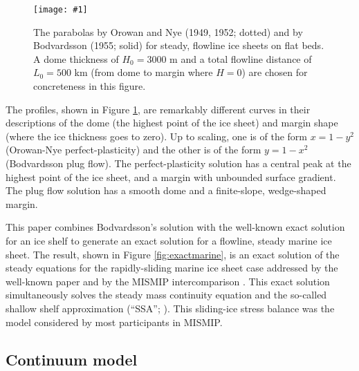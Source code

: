 \documentclass[twocolumn,letterpaper]{igs}
\newcommand{\onecol}[1]{\texttt{[image: \#1]}}
\begin{document}
\begin{figure}[ht]
\onecol{twoparabolas}
\caption{The parabolas by Orowan and Nye (1949, 1952; dotted) and by Bodvardsson (1955; solid) for steady, flowline ice sheets on flat beds.  A dome thickness of $H_0=3000$ m and a total flowline distance of $L_0=500$ km (from dome to margin where $H=0$) are chosen for concreteness in this figure.} \label{fig:twoparabolas}
\end{figure}

The profiles, shown in Figure \ref{fig:twoparabolas}, are remarkably different curves in their descriptions of the dome (the highest point of the ice sheet) and margin shape (where the ice thickness goes to zero).   Up to scaling, one is of the form $x=1-y^2$ (Orowan-Nye perfect-plasticity)\nocite{Nye52plastic,Orowan} and the other is of the form $y=1-x^2$ (Bodvardsson plug flow).  The perfect-plasticity solution has a central peak at the highest point of the ice sheet, and a margin with unbounded surface gradient.  The plug flow solution has a smooth dome and a finite-slope, wedge-shaped margin.

This paper combines Bodvardsson's solution with the well-known exact solution for an ice shelf \citep{vanderVeen83,vanderVeen} to generate an exact solution for a flowline, steady marine ice sheet.  The result, shown in Figure \ref{fig:exactmarine}, is an exact solution of the steady equations for the rapidly-sliding marine ice sheet case addressed by the well-known paper \cite{SchoofMarine1} and by the MISMIP intercomparison \citep{MISMIP2012}.  This exact solution simultaneously solves the steady mass continuity equation and the so-called shallow shelf approximation (``SSA''; \citep{BBssasliding,MacAyeal,WeisGreveHutter}).  This sliding-ice stress balance was the model considered by most participants in MISMIP.


\subsection*{Continuum model}
\end{document}
